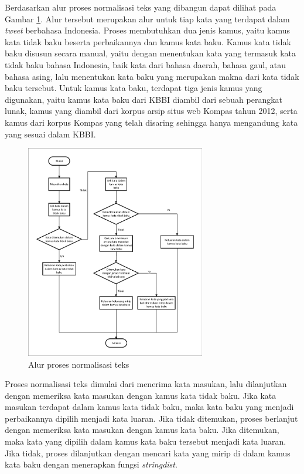 Berdasarkan \parencite{saragih2017normalisasi} alur proses normalisasi teks yang dibangun dapat dilihat pada Gambar \ref{fig:flow_saragih}. Alur tersebut merupakan alur untuk tiap kata yang terdapat dalam \textit{tweet} berbahasa Indonesia. Proses membutuhkan dua jenis kamus, yaitu kamus kata tidak baku beserta perbaikannya dan kamus kata baku. Kamus kata tidak baku disusun secara manual, yaitu dengan menentukan kata yang termasuk kata tidak baku bahasa Indonesia, baik kata dari bahasa daerah, bahasa gaul, atau bahasa asing, lalu menentukan kata baku yang merupakan makna dari kata tidak baku tersebut. Untuk kamus kata baku, terdapat tiga jenis kamus yang digunakan, yaitu kamus kata baku dari KBBI diambil dari sebuah perangkat lunak, kamus yang diambil dari korpus arsip situs web Kompas tahun 2012, serta kamus dari korpus Kompas yang telah disaring sehingga hanya mengandung kata yang sesuai dalam KBBI.
\begin{figure}[ht]
	\centering
	\includegraphics[width=0.7\textwidth, trim=2 2 2 2, clip]{resources/2/flow_saragih.pdf}
	\caption{Alur proses normalisasi teks \parencite{saragih2017normalisasi}}
	\label{fig:flow_saragih}
\end{figure}

Proses normalisasi teks dimulai dari menerima kata masukan, lalu dilanjutkan dengan memeriksa kata masukan dengan kamus kata tidak baku. Jika kata masukan terdapat dalam kamus kata tidak baku, maka kata baku yang menjadi perbaikannya dipilih menjadi kata luaran. Jika tidak ditemukan, proses berlanjut dengan memeriksa kata masukan dengan kamus kata baku. Jika ditemukan, maka kata yang dipilih dalam kamus kata baku tersebut menjadi kata luaran. Jika tidak, proses dilanjutkan dengan mencari kata yang mirip di dalam kamus kata baku dengan menerapkan fungsi \textit{stringdist}.

